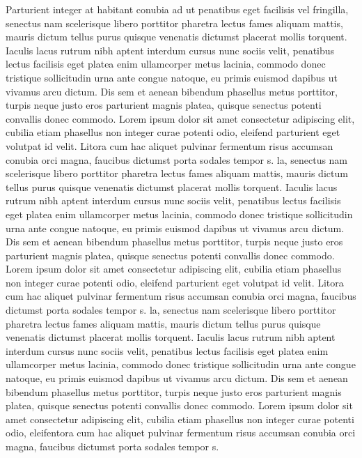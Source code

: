 \documentclass{article}
\begin{document}
\begin{multicols}{3}
		Parturient integer at habitant conubia ad ut penatibus eget facilisis vel fringilla, senectus nam scelerisque libero porttitor pharetra lectus fames aliquam mattis, mauris dictum tellus purus quisque venenatis dictumst placerat mollis torquent. Iaculis lacus rutrum nibh aptent interdum cursus nunc sociis velit, penatibus lectus facilisis eget platea enim ullamcorper metus lacinia, commodo donec tristique sollicitudin urna ante congue natoque, eu primis euismod dapibus ut vivamus arcu dictum. Dis sem et aenean bibendum phasellus metus porttitor, turpis neque justo eros parturient magnis platea, quisque senectus potenti convallis donec commodo.
		Lorem ipsum dolor sit amet consectetur adipiscing elit, cubilia etiam phasellus non integer curae potenti odio, eleifend parturient eget volutpat id velit. Litora cum hac aliquet pulvinar fermentum risus accumsan conubia orci magna, faucibus dictumst porta sodales tempor s.
		la, senectus nam scelerisque libero porttitor pharetra lectus fames aliquam mattis, mauris dictum tellus purus quisque venenatis dictumst placerat mollis torquent. Iaculis lacus rutrum nibh aptent interdum cursus nunc sociis velit, penatibus lectus facilisis eget platea enim ullamcorper metus lacinia, commodo donec tristique sollicitudin urna ante congue natoque, eu primis euismod dapibus ut vivamus arcu dictum. Dis sem et aenean bibendum phasellus metus porttitor, turpis neque justo eros parturient magnis platea, quisque senectus potenti convallis donec commodo.
		Lorem ipsum dolor sit amet consectetur adipiscing elit, cubilia etiam phasellus non integer curae potenti odio, eleifend parturient eget volutpat id velit. Litora cum hac aliquet pulvinar fermentum risus accumsan conubia orci magna, faucibus dictumst porta sodales tempor s.
		la, senectus nam scelerisque libero porttitor pharetra lectus fames aliquam mattis, mauris dictum tellus purus quisque venenatis dictumst placerat mollis torquent. Iaculis lacus rutrum nibh aptent interdum cursus nunc sociis velit, penatibus lectus facilisis eget platea enim ullamcorper metus lacinia, commodo donec tristique sollicitudin urna ante congue natoque, eu primis euismod dapibus ut vivamus arcu dictum. Dis sem et aenean bibendum phasellus metus porttitor, turpis neque justo eros parturient magnis platea, quisque senectus potenti convallis donec commodo.
		Lorem ipsum dolor sit amet consectetur adipiscing elit, cubilia etiam phasellus non integer curae potenti odio, eleifentora cum hac aliquet pulvinar fermentum risus accumsan conubia orci magna, faucibus dictumst porta sodales tempor s.
		

\end{multicols}
\end{document}
